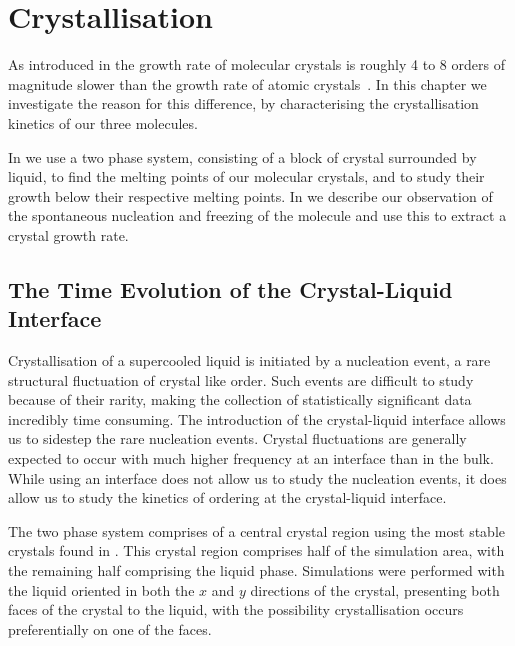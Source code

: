 \chapter{Crystallisation}
\label{sec:crystallisation}

As introduced in  the growth rate of molecular crystals is roughly 4 to 8 orders of magnitude slower than the growth rate of atomic crystals~\cite{orava:14}. In this chapter we investigate the reason for this difference, by characterising the crystallisation kinetics of our three molecules.

In  we use a two phase system, consisting of a block of crystal surrounded by liquid, to find the melting points of our molecular crystals, and to study their growth below their respective melting points. In  we describe our observation of the spontaneous nucleation and freezing of the \done molecule and use this to extract a crystal growth rate.

\section{The Time Evolution of the Crystal-Liquid Interface}
\label{sec:two phase}

Crystallisation of a supercooled liquid is initiated by a nucleation event, a rare structural fluctuation of crystal like order. Such events are difficult to study because of their rarity, making the collection of statistically significant data incredibly time consuming. The introduction of the crystal-liquid interface allows us to sidestep the rare nucleation events. Crystal fluctuations are generally expected to occur with much higher frequency at an interface than in the bulk. While using an interface does not allow us to study the nucleation events, it does allow us to study the kinetics of ordering at the crystal-liquid interface.

The two phase system comprises of a central crystal region using the most stable crystals found in . This crystal region comprises half of the simulation area, with the remaining half comprising the liquid phase. Simulations were performed with the liquid oriented in both the $x$ and $y$ directions of the crystal, presenting both faces of the crystal to the liquid, with the possibility crystallisation occurs preferentially on one of the faces.

